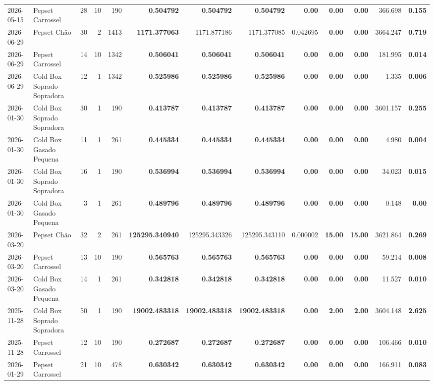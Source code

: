 {\begin{center}
{\begin{tabular}{@{}llrrrrrrrrrrr@{}}
2026-05-15 & Pepset Carrossel & 28 & 10 & 190 & \textbf{0.504792} & \textbf{0.504792} & \textbf{0.504792} & \textbf{0.00} & \textbf{0.00} & \textbf{0.00} & 366.698 & \textbf{0.155} \\
2026-06-29 & Pepset Chão & 30 & 2 & 1413 & \textbf{1171.377063} & 1171.877186 & 1171.377085 & 0.042695 & \textbf{0.00} & \textbf{0.00} & 3664.247 & \textbf{0.719} \\
2026-06-29 & Pepset Carrossel & 14 & 10 & 1342 & \textbf{0.506041} & \textbf{0.506041} & \textbf{0.506041} & \textbf{0.00} & \textbf{0.00} & \textbf{0.00} & 181.995 & \textbf{0.014} \\
2026-06-29 & Cold Box Soprado Sopradora & 12 & 1 & 1342 & \textbf{0.525986} & \textbf{0.525986} & \textbf{0.525986} & \textbf{0.00} & \textbf{0.00} & \textbf{0.00} & 1.335 & \textbf{0.006} \\
2026-01-30 & Cold Box Soprado Sopradora & 30 & 1 & 190 & \textbf{0.413787} & \textbf{0.413787} & \textbf{0.413787} & \textbf{0.00} & \textbf{0.00} & \textbf{0.00} & 3601.157 & \textbf{0.255} \\
2026-01-30 & Cold Box Gasado Pequena & 11 & 1 & 261 & \textbf{0.445334} & \textbf{0.445334} & \textbf{0.445334} & \textbf{0.00} & \textbf{0.00} & \textbf{0.00} & 4.980 & \textbf{0.004} \\
2026-01-30 & Cold Box Soprado Sopradora & 16 & 1 & 190 & \textbf{0.536994} & \textbf{0.536994} & \textbf{0.536994} & \textbf{0.00} & \textbf{0.00} & \textbf{0.00} & 34.023 & \textbf{0.015} \\
2026-01-30 & Cold Box Gasado Pequena & 3 & 1 & 261 & \textbf{0.489796} & \textbf{0.489796} & \textbf{0.489796} & \textbf{0.00} & \textbf{0.00} & \textbf{0.00} & 0.148 & \textbf{0.00} \\
2026-03-20 & Pepset Chão & 32 & 2 & 261 & \textbf{125295.340940} & 125295.343326 & 125295.343110 & 0.000002 & \textbf{15.00} & \textbf{15.00} & 3621.864 & \textbf{0.269} \\
2026-03-20 & Pepset Carrossel & 13 & 10 & 190 & \textbf{0.565763} & \textbf{0.565763} & \textbf{0.565763} & \textbf{0.00} & \textbf{0.00} & \textbf{0.00} & 59.214 & \textbf{0.008} \\
2026-03-20 & Cold Box Gasado Pequena & 14 & 1 & 261 & \textbf{0.342818} & \textbf{0.342818} & \textbf{0.342818} & \textbf{0.00} & \textbf{0.00} & \textbf{0.00} & 11.527 & \textbf{0.010} \\
2025-11-28 & Cold Box Soprado Sopradora & 50 & 1 & 190 & \textbf{19002.483318} & \textbf{19002.483318} & \textbf{19002.483318} & \textbf{0.00} & \textbf{2.00} & \textbf{2.00} & 3604.148 & \textbf{2.625} \\
2025-11-28 & Pepset Carrossel & 12 & 10 & 190 & \textbf{0.272687} & \textbf{0.272687} & \textbf{0.272687} & \textbf{0.00} & \textbf{0.00} & \textbf{0.00} & 106.466 & \textbf{0.010} \\
2026-01-29 & Pepset Carrossel & 21 & 10 & 478 & \textbf{0.630342} & \textbf{0.630342} & \textbf{0.630342} & \textbf{0.00} & \textbf{0.00} & \textbf{0.00} & 166.911 & \textbf{0.083} \\
\bottomrule
\end{tabular}%
}
\end{center}
}

